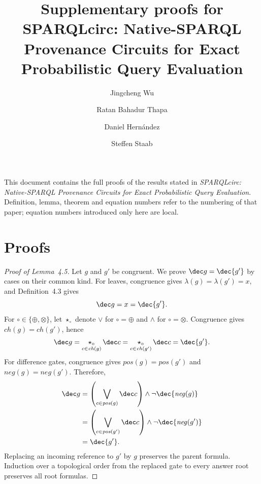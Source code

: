 \documentclass[sigconf, nonacm]{acmart}
\begin{document}
\title[Supplementary proofs]{Supplementary proofs for SPARQLcirc:
Native-SPARQL Provenance Circuits for Exact Probabilistic Query Evaluation}
\author{Jingcheng Wu}
\author{Ratan Bahadur Thapa}
\author{Daniel Hern\'andez}
\author{Steffen Staab}
\renewcommand{\shortauthors}{Wu et al.}
\maketitle
\pagestyle{plain}

\noindent
This document contains the full proofs of the results stated in
\emph{SPARQLcirc: Native-SPARQL Provenance Circuits for Exact Probabilistic
Query Evaluation}. Definition, lemma, theorem and equation numbers refer to the
numbering of that paper; equation numbers introduced only here are local.

\appendix
\section{Proofs}\label{app:proofs}

\begin{proof}[Proof of Lemma~4.5]
Let $g$ and $g'$ be congruent. We prove $\dec g=\dec{g'}$ by cases on their common kind.
For leaves, congruence gives $\lambda(g)=\lambda(g')=x$, and Definition~4.3 gives
\[
 \dec g=x=\dec{g'}.
\]
For $\circ\in\{\oplus,\otimes\}$, let $\star_\circ$ denote $\lor$ for $\circ=\oplus$ and $\land$ for $\circ=\otimes$. Congruence gives $\mathit{ch}(g)=\mathit{ch}(g')$, hence
\[
 \dec g=\mathop{\star_\circ}_{c\in\mathit{ch}(g)}\dec c
 =\mathop{\star_\circ}_{c\in\mathit{ch}(g')}\dec c
 =\dec{g'}.
\]
For difference gates, congruence gives $\mathit{pos}(g)=\mathit{pos}(g')$ and $\mathit{neg}(g)=\mathit{neg}(g')$. Therefore,
\begin{align*}
 \dec g
 &=\left(\bigvee_{c\in\mathit{pos}(g)}\dec c\right)
   \land\neg\dec{\mathit{neg}(g)}\\
 &=\left(\bigvee_{c\in\mathit{pos}(g')}\dec c\right)
   \land\neg\dec{\mathit{neg}(g')}\\
 &=\dec{g'}.
\end{align*}
Replacing an incoming reference to $g'$ by $g$ preserves the parent formula. Induction over a topological order from the replaced gate to every answer root preserves all root formulas.
\end{proof}
\end{document}
